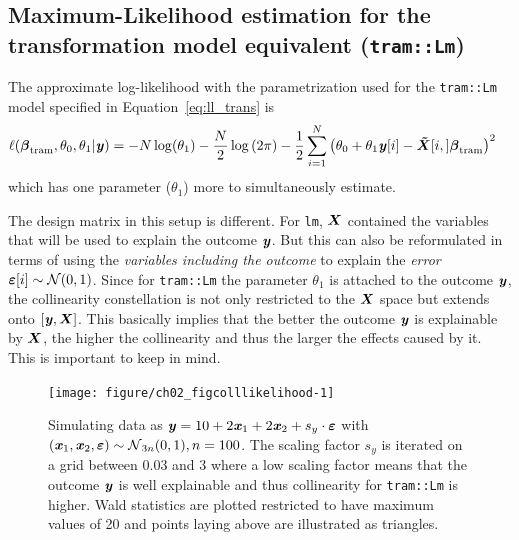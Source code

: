 \documentclass[11pt,a4paper,twoside]{book}\usepackage[]{graphicx}\usepackage[]{xcolor}
\newenvironment{knitrout}{}{} %
\begin{document}
\subsection{Maximum-Likelihood estimation for the transformation model equivalent (\texttt{tram::Lm})}\label{sec:mltramLM}

The approximate log-likelihood with the parametrization used for the \texttt{tram::Lm} model specified in Equation~\eqref{eq:ll_trans} is
\begin{align}
\ell({\boldsymbol{\beta}}_\text{tram},\theta_0,\theta_1|{\textbf{\textit{y}}})&=-N\log(\theta_1)-\frac{N}{2}\log\left(2\pi\right)-\frac{1}{2}\sum_{i=1}^N\left(\theta_0+\theta_1 {\textbf{\textit{y}}}[i]-\boldsymbol{\tilde{X}}[i,]{\boldsymbol{\beta}}_\text{tram}\right)^2
\label{eq:ll_tramLm}
\end{align}
which has one parameter ($\theta_1$) more to simultaneously estimate.

The design matrix in this setup is different. For \texttt{lm}, ${\boldsymbol{X}}$ contained the variables that will be used to explain the outcome ${\textbf{\textit{y}}}$. But this can also be reformulated in terms of using the \textit{variables including the outcome} to explain the  \textit{error} ${\boldsymbol{\varepsilon}}[i]\sim \operatorname{\mathcal{N}}(0,1)$.
Since for \texttt{tram::Lm} the parameter $\theta_1$ is attached to the outcome ${\textbf{\textit{y}}}$, the collinearity constellation is not only restricted to the ${\boldsymbol{X}}$ space but extends onto $\left[{\textbf{\textit{y}}},{\boldsymbol{X}}\right]$.
This basically implies that the better the outcome ${\textbf{\textit{y}}}$ is explainable by ${\boldsymbol{X}}$, the higher the collinearity and thus the larger the effects caused by it. This is important to keep in mind.

\begin{figure}[h]%
\begin{center}
\begin{knitrout}
\color{fgcolor}
\texttt{[image: figure/ch02\_figcolllikelihood-1]} 
\end{knitrout}
\end{center}
\caption{Simulating data as ${\textbf{\textit{y}}}=10+2{\textbf{\textit{x}}}_1+2{\textbf{\textit{x}}}_2+s_y\cdot {\boldsymbol{\varepsilon}}$ with $\left({\textbf{\textit{x}}}_1,{\textbf{\textit{x}}}_2,{\boldsymbol{\varepsilon}}\right)\sim\operatorname{\mathcal{N}}_{3n}(0,1),n=100$. The scaling factor $s_y$ is iterated on a grid between 0.03 and 3 where a low scaling factor means that the outcome ${\textbf{\textit{y}}}$ is well explainable and thus collinearity for \texttt{tram::Lm} is higher. Wald statistics are plotted restricted to have maximum values of 20 and points laying above are illustrated as triangles.}
\label{fig:colllikelihood}
\end{figure}
\end{document}
